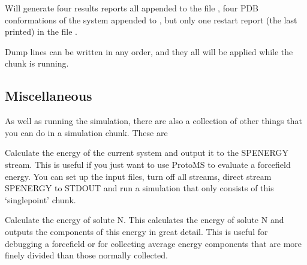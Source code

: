 \documentclass[letterpaper,10pt,english]{sphinxmanual}
\begin{document}
Will generate four results reports all appended to the file , four PDB conformations of the system appended to , but only one restart report (the last printed) in the file .

Dump lines can be written in any order, and they all will be applied while the  chunk is running.


\subsection{Miscellaneous}
\label{\detokenize{protoms:miscellaneous}}\label{\detokenize{protoms:misccmd}}
As well as running the simulation, there are also a collection of other things that you can do in a simulation chunk. These are

\ignorespaces 
\def\sphinxLiteralBlockLabel{\label{\detokenize{protoms:index-82}}}
%
\begin{sphinxVerbatim}[commandchars=\\\{\}]
 
\end{sphinxVerbatim}

Calculate the energy of the current system and output it to the SPENERGY stream. This is useful if you just want to use ProtoMS to evaluate a forcefield energy. You can set up the input files, turn off all streams, direct stream SPENERGY to STDOUT and run a simulation that only consists of this ‘singlepoint’ chunk.

\ignorespaces 
\def\sphinxLiteralBlockLabel{\label{\detokenize{protoms:index-83}}}
%
\begin{sphinxVerbatim}[commandchars=\\\{\}]
  
\end{sphinxVerbatim}

Calculate the energy of solute N. This calculates the energy of solute N and outputs the components of this energy in great detail. This is useful for debugging a forcefield or for collecting average energy components that are more finely divided than those normally collected.

\ignorespaces 
\def\sphinxLiteralBlockLabel{\label{\detokenize{protoms:index-84}}}
%
\begin{sphinxVerbatim}[commandchars=\\\{\}]
 
\end{sphinxVerbatim}
\end{document}
